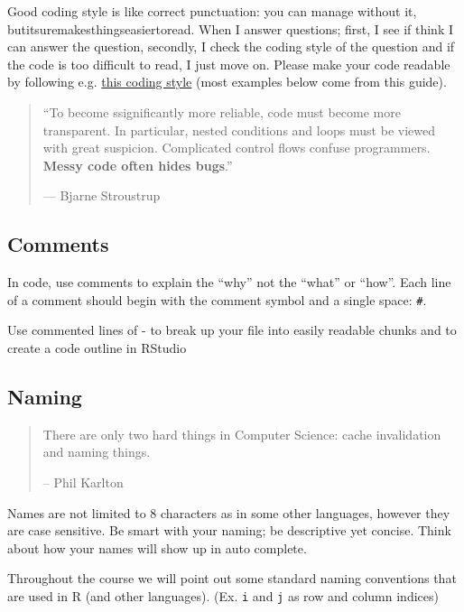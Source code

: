 \documentclass[]{book}
\theoremstyle{definition}
\theoremstyle{definition}
\theoremstyle{definition}
\theoremstyle{remark}
\let\BeginKnitrBlock\begin \let\EndKnitrBlock\end
\begin{document}
Good coding style is like correct punctuation: you can manage without
it, butitsuremakesthingseasiertoread. When I answer questions; first, I
see if think I can answer the question, secondly, I check the coding
style of the question and if the code is too difficult to read, I just
move on. Please make your code readable by following e.g.
\href{http://style.tidyverse.org/}{this coding style} (most examples
below come from this guide).

\begin{quote}
``To become ssignificantly more reliable, code must become more
transparent. In particular, nested conditions and loops must be viewed
with great suspicion. Complicated control flows confuse programmers.
\textbf{Messy code often hides bugs}.''

--- Bjarne Stroustrup
\end{quote}

\subsection{Comments}\label{comments}

In code, use comments to explain the ``why'' not the ``what'' or
``how''. Each line of a comment should begin with the comment symbol and
a single space: \texttt{\#}.

\BeginKnitrBlock{rmdtip}
Use commented lines of - to break up your file into easily readable
chunks and to create a code outline in RStudio
\EndKnitrBlock{rmdtip}

\subsection{Naming}\label{naming}

\begin{quote}
There are only two hard things in Computer Science: cache invalidation
and naming things.

-- Phil Karlton
\end{quote}

Names are not limited to 8 characters as in some other languages,
however they are case sensitive. Be smart with your naming; be
descriptive yet concise. Think about how your names will show up in auto
complete.

Throughout the course we will point out some standard naming conventions
that are used in R (and other languages). (Ex. \texttt{i} and \texttt{j}
as row and column indices)
\end{document}
